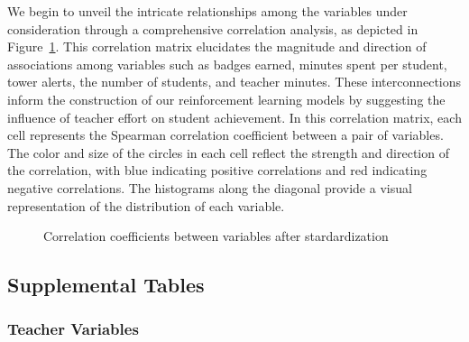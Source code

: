 \documentclass[
  number,
  preprint,
  3p,
  onecolumn]{elsarticle}
\begin{document}
We begin to unveil the intricate relationships among the variables under
consideration through a comprehensive correlation analysis, as depicted
in Figure~\ref{fig-corr}. This correlation matrix elucidates the
magnitude and direction of associations among variables such as badges
earned, minutes spent per student, tower alerts, the number of students,
and teacher minutes. These interconnections inform the construction of
our reinforcement learning models by suggesting the influence of teacher
effort on student achievement. In this correlation matrix, each cell
represents the Spearman correlation coefficient between a pair of
variables. The color and size of the circles in each cell reflect the
strength and direction of the correlation, with blue indicating positive
correlations and red indicating negative correlations. The histograms
along the diagonal provide a visual representation of the distribution
of each variable.

\begin{figure}


\caption{\label{fig-corr}Correlation coefficients between variables
after stardardization}

\end{figure}%

\subsection{Supplemental Tables}\label{supplemental-tables}

\subsubsection{Teacher Variables}\label{teacher-variables}
\end{document}
